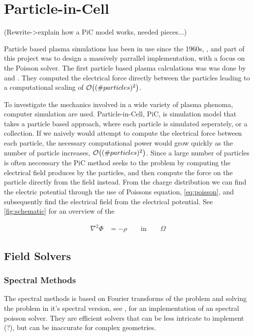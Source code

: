 \section{Particle-in-Cell}
(Rewrite->explain how a PiC model works, needed pieces...)

    Particle based plasma simulations has been in use since the 1960s, \citep{verboncoeur_particle_2005},
    and part of this project was to design a massively parrallel implementation,
    with a focus on the Poisson solver. The first particle based plasma calculations was
    was done by \cite{dawson_one-dimensional_1962} and \citet{buneman_dissipation_1959}.
    They computed the electrical force directly between the particles leading
    to a computational scaling of \(\order{(\#particles)^2}\).



 To investigate the mechanics involved in a wide variety of plasma phenoma,
 computer simulation are used. Particle-in-Cell, PiC, is simulation model that takes a
 particle based approach, where each particle is simulated seperately, or a
 collection. If we naively would attempt to compute the electrical force between each particle, the necessary
 computational power would grow quickly as the number of particle increases, \(\order{(\#particles)^2}\).
 Since a large number of particles is often neccessary the PiC method seeks to
 the problem by computing the electrical field produces by the particles, and then
 compute the force on the particle directly from the field instead. From the charge
 distribution we can find the electric potential through the use of Poissons
 equation, \cref{eq:poisson}, and subsequently find the electrical field from
 the electrical potential. See \cref{fig:schematic} for an overview of the

    \begin{align}
        \nabla ^2 \Phi &= -\rho \qquad \text{in} \qquad \Omega \label{eq:poisson}
    \end{align}

  


    \subsection{Field Solvers}

    \subsubsection{Spectral Methods}
    	The spectral methods is based on Fourier transforms of the problem and solving
    	the problem in it's spectral version, see \citep{shen_efficient_1994}, for an
    	implementation of an spectral poisson solver. They are efficient solvers that
    	can be less intricate to implement (?), but can be inaccurate for complex geometries.

